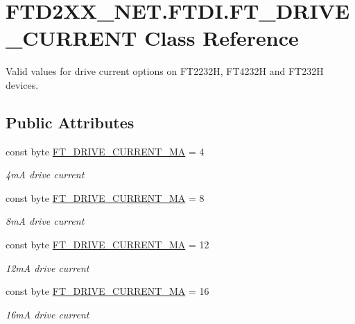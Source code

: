 \hypertarget{class_f_t_d2_x_x___n_e_t_1_1_f_t_d_i_1_1_f_t___d_r_i_v_e___c_u_r_r_e_n_t}{}\section{F\+T\+D2\+X\+X\+\_\+\+N\+E\+T.\+F\+T\+D\+I.\+F\+T\+\_\+\+D\+R\+I\+V\+E\+\_\+\+C\+U\+R\+R\+E\+NT Class Reference}
\label{class_f_t_d2_x_x___n_e_t_1_1_f_t_d_i_1_1_f_t___d_r_i_v_e___c_u_r_r_e_n_t}


Valid values for drive current options on F\+T2232H, F\+T4232H and F\+T232H devices.  


\subsection*{Public Attributes}
\begin{DoxyCompactItemize}
\item 
const byte \mbox{\hyperlink{class_f_t_d2_x_x___n_e_t_1_1_f_t_d_i_1_1_f_t___d_r_i_v_e___c_u_r_r_e_n_t_af6b404bcc6f2eb88bbc95b183d5729ea}{F\+T\+\_\+\+D\+R\+I\+V\+E\+\_\+\+C\+U\+R\+R\+E\+N\+T\+\_\+MA}} = 4
\begin{DoxyCompactList}\small\item\em 4mA drive current \end{DoxyCompactList}\item 
const byte \mbox{\hyperlink{class_f_t_d2_x_x___n_e_t_1_1_f_t_d_i_1_1_f_t___d_r_i_v_e___c_u_r_r_e_n_t_a7cb36b629419f297bff79a180c6d113f}{F\+T\+\_\+\+D\+R\+I\+V\+E\+\_\+\+C\+U\+R\+R\+E\+N\+T\+\_\+MA}} = 8
\begin{DoxyCompactList}\small\item\em 8mA drive current \end{DoxyCompactList}\item 
const byte \mbox{\hyperlink{class_f_t_d2_x_x___n_e_t_1_1_f_t_d_i_1_1_f_t___d_r_i_v_e___c_u_r_r_e_n_t_a6d7d0bea0a4e51b5707870267fbd6108}{F\+T\+\_\+\+D\+R\+I\+V\+E\+\_\+\+C\+U\+R\+R\+E\+N\+T\+\_\+MA}} = 12
\begin{DoxyCompactList}\small\item\em 12mA drive current \end{DoxyCompactList}\item 
const byte \mbox{\hyperlink{class_f_t_d2_x_x___n_e_t_1_1_f_t_d_i_1_1_f_t___d_r_i_v_e___c_u_r_r_e_n_t_a9e0574be4a6ba94e3e2255ac209f658f}{F\+T\+\_\+\+D\+R\+I\+V\+E\+\_\+\+C\+U\+R\+R\+E\+N\+T\+\_\+MA}} = 16
\begin{DoxyCompactList}\small\item\em 16mA drive current \end{DoxyCompactList}\end{DoxyCompactItemize}


